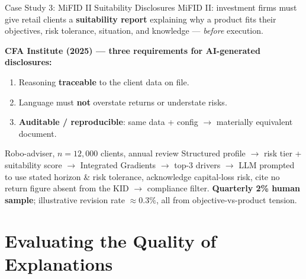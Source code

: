 \documentclass[9pt,t]{beamer}
\begin{document}
\begin{frame}{Case Study 3: MiFID II Suitability Disclosures}
MiFID II: investment firms must give retail clients a \textbf{suitability
report} explaining why a product fits their objectives, risk tolerance,
situation, and knowledge --- \emph{before} execution.

\medskip
\textbf{CFA Institute (2025) --- three requirements for AI-generated disclosures:}
\begin{enumerate}\small
  \item Reasoning \textbf{traceable} to the client data on file.
  \item Language must \textbf{not} overstate returns or understate risks.
  \item \textbf{Auditable / reproducible}: same data + config $\to$ materially
        equivalent document.
\end{enumerate}

\medskip
\begin{exampleblock}{Robo-adviser, $n=12{,}000$ clients, annual review}
Structured profile $\to$ risk tier + suitability score $\to$ Integrated Gradients
$\to$ top-3 drivers $\to$ LLM prompted to use stated horizon \& risk tolerance,
acknowledge capital-loss risk, cite no return figure absent from the KID $\to$
compliance filter. \textbf{Quarterly 2\% human sample}; illustrative revision
rate $\approx 0.3\%$, all from objective-vs-product tension.
\end{exampleblock}
\end{frame}

\section{Evaluating the Quality of Explanations}
\end{document}
